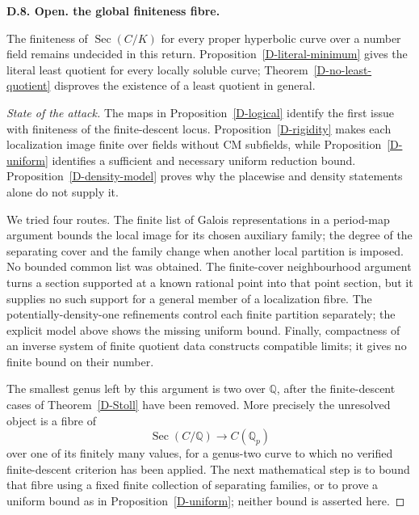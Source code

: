 \documentclass[11pt,oneside]{article}
\makeatletter
\newcounter{statementanchor}
\newenvironment{statement}[3]{%
 \refstepcounter{statementanchor}\def\@currentlabel{#1}%
 \par\addvspace{9pt}\noindent
 \textbf{#1. #2. #3.}\par\nobreak\noindent\ignorespaces
}{\par\addvspace{5pt}}
\makeatother
\begin{document}
\begin{statement}{D.8}{Open}{the global finiteness fibre}
\label{st:D.8}
\label{D-open}
The finiteness of $\operatorname{Sec}(C/K)$
for every proper hyperbolic curve over a number
field remains undecided in this return.
Proposition~\ref{D-literal-minimum} gives the literal
least quotient for every locally soluble curve;
Theorem~\ref{D-no-least-quotient} disproves the existence
of a least quotient in general.
\end{statement}
\begin{proof}[State of the attack]
The maps in Proposition~\ref{D-logical} identify
the first issue with finiteness of the
finite-descent locus. Proposition~\ref{D-rigidity}
makes each localization image finite over
fields without CM subfields, while
Proposition~\ref{D-uniform} identifies a
sufficient and necessary uniform reduction
bound. Proposition~\ref{D-density-model}
proves why the placewise and density
statements alone do not supply it.

We tried four routes. The finite list of
Galois representations in a period-map
argument bounds the local image for its
chosen auxiliary family; the degree of the
separating cover and the family change
when another local partition is imposed.
No bounded common list was obtained.
The finite-cover neighbourhood argument
turns a section supported at a known
rational point into that point section,
but it supplies no such support for a
general member of a localization fibre.
The potentially-density-one refinements
control each finite partition separately;
the explicit model above shows the missing
uniform bound. Finally, compactness of an
inverse system of finite quotient data
constructs compatible limits; it gives
no finite bound on their number.

The smallest genus left by this argument
is two over $\mathbb Q$, after the
finite-descent cases of Theorem~\ref{D-Stoll}
have been removed. More precisely the
unresolved object is a fibre of
\[
 \operatorname{Sec}(C/\mathbb Q)
 \longrightarrow C(\mathbb Q_p)
\]
over one of its finitely many values, for
a genus-two curve to which no verified
finite-descent criterion has been applied.
The next mathematical step is to bound
that fibre using a fixed finite collection
of separating families, or to prove a
uniform bound as in Proposition~\ref{D-uniform};
neither bound is asserted here.


\end{proof}
\end{document}
